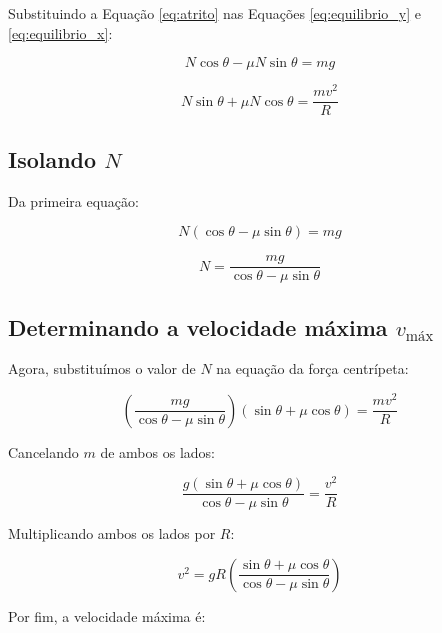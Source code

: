 \documentclass[a4paper,12pt]{article}
\begin{document}
\begin{flushleft}
Substituindo a Equação \eqref{eq:atrito} nas Equações \eqref{eq:equilibrio_y} e \eqref{eq:equilibrio_x}:

\begin{equation}
N \cos\theta - \mu N \sin\theta = mg
\end{equation}

\begin{equation}
N \sin\theta + \mu N \cos\theta = \frac{mv^2}{R}
\end{equation}

\subsection*{Isolando \( N \)}

Da primeira equação:

\begin{equation}
N \left( \cos\theta - \mu \sin\theta \right) = mg
\end{equation}

\begin{equation}
N = \frac{mg}{\cos\theta - \mu \sin\theta}
\label{eq:N}
\end{equation}

\subsection*{Determinando a velocidade máxima \( v_{\text{máx}} \)}

Agora, substituímos o valor de \( N \) na equação da força centrípeta:

\begin{equation}
\left( \frac{mg}{\cos\theta - \mu \sin\theta} \right) \left( \sin\theta + \mu \cos\theta \right) = \frac{mv^2}{R}
\end{equation}

Cancelando \( m \) de ambos os lados:

\begin{equation}
\frac{g \left( \sin\theta + \mu \cos\theta \right)}{\cos\theta - \mu \sin\theta} = \frac{v^2}{R}
\end{equation}

Multiplicando ambos os lados por \( R \):

\begin{equation}
v^2 = gR \left( \frac{ \sin\theta + \mu \cos\theta }{ \cos\theta - \mu \sin\theta } \right)
\end{equation}

Por fim, a velocidade máxima é:


\end{flushleft}
\end{document}
